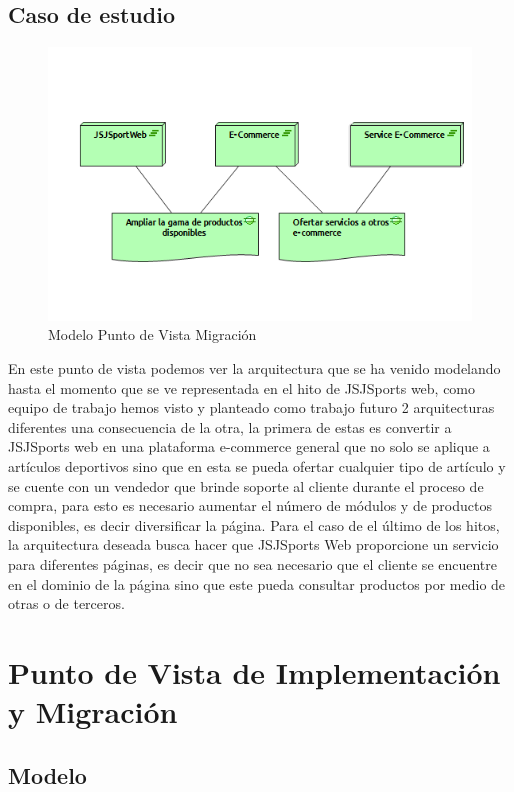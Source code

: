 \subsection{Caso de estudio}

\begin{figure}[th!]
	\centering
	\includegraphics[width=0.8\linewidth]{arquitectura/imagenes/PuntoVistaMigracion}
	\caption{Modelo Punto de Vista Migración}
	\label{modelo migracion}
\end{figure}

En este punto de vista podemos ver la arquitectura que se ha venido modelando hasta el momento que se ve representada en el hito de JSJSports web, como equipo de trabajo hemos visto y planteado como trabajo futuro 2 arquitecturas diferentes una consecuencia de la otra, la primera de estas es convertir a JSJSports web en una plataforma e-commerce general que no solo se aplique a artículos deportivos sino que en esta se pueda ofertar cualquier tipo de artículo y se cuente con un vendedor que brinde soporte al cliente durante el proceso de compra, para esto es necesario aumentar el número de módulos y de productos disponibles, es decir diversificar la página.\newline
Para el caso de el último de los hitos, la arquitectura deseada busca hacer que JSJSports Web proporcione un servicio para diferentes páginas, es decir que no sea necesario que el cliente se encuentre en el dominio de la página sino que este pueda consultar productos por medio de otras o de terceros.

\newpage

\section{Punto de Vista de Implementación y Migración}

\subsection{Modelo}

